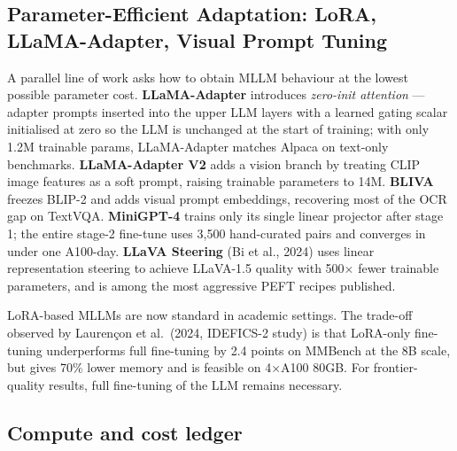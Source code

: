 \documentclass{article}
\begin{document}
\subsection{Parameter-Efficient Adaptation: LoRA, LLaMA-Adapter, Visual Prompt Tuning}\label{parameter-efficient-adaptation-lora-llama-adapter-visual-prompt-tuning}

A parallel line of work asks how to obtain MLLM behaviour at the lowest possible parameter cost. \textbf{LLaMA-Adapter} \citep{zhang2023videollamaaninstru} introduces \emph{zero-init attention} --- adapter prompts inserted into the upper LLM layers with a learned gating scalar initialised at zero so the LLM is unchanged at the start of training; with only 1.2M trainable params, LLaMA-Adapter matches Alpaca on text-only benchmarks. \textbf{LLaMA-Adapter V2} \citep{gao20232023} adds a vision branch by treating CLIP image features as a soft prompt, raising trainable parameters to 14M. \textbf{BLIVA} \citep{hu20242024} freezes BLIP-2 and adds visual prompt embeddings, recovering most of the OCR gap on TextVQA. \textbf{MiniGPT-4} trains only its single linear projector after stage 1; the entire stage-2 fine-tune uses 3,500 hand-curated pairs and converges in under one A100-day. \textbf{LLaVA Steering} (Bi et al., 2024) uses linear representation steering to achieve LLaVA-1.5 quality with 500× fewer trainable parameters, and is among the most aggressive PEFT recipes published.

LoRA-based MLLMs are now standard in academic settings. The trade-off observed by Laurençon et al.~(2024, IDEFICS-2 study) is that LoRA-only fine-tuning underperforms full fine-tuning by 2.4 points on MMBench at the 8B scale, but gives 70\% lower memory and is feasible on 4×A100 80GB. For frontier-quality results, full fine-tuning of the LLM remains necessary.

\subsection{Compute and cost ledger}\label{compute-and-cost-ledger}
\end{document}
